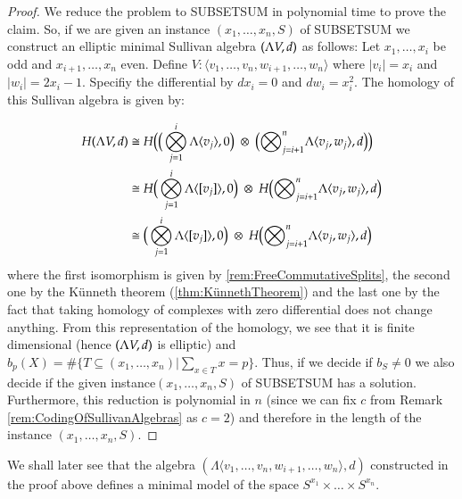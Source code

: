  \begin{proof}
  We reduce the problem to SUBSETSUM in polynomial time to prove the claim.
  So, if we are given an instance $(x_1, \ldots, x_n, S)$ of SUBSETSUM we construct an elliptic minimal Sullivan
  algebra $(\Lambda V,d)$ as follows: \newline
  Let $x_1, \ldots, x_i$ be odd and $x_{i+1}, \ldots, x_n$ even. Define 
  $V \colon \langle v_1, \ldots, v_n, w_{i+1}, \ldots , w_n \rangle$ where $|v_i| = x_i$ and $|w_i| = 2x_i -1$.
  Specifiy the differential by $dx_i = 0$ and $dw_i = x_i^2$. The homology of this Sullivan algebra is given by:
   
  \begin{align*}
  H (\Lambda V,d) &\cong H \big{(} \big{(}\bigotimes_{j = 1}^i \Lambda \langle v_j \rangle , 0 \big{)} \;\otimes \;  
  \big{(} {\bigotimes}_{j=i + 1}^n \Lambda \langle v_{j} ,w_{j}\rangle , d \big{)} \big{)}  \\
  &\cong H\big{(} \bigotimes_{j = 1}^i \Lambda \langle [v_j] \rangle , 0 \big{)}
  \; \otimes \;H \big{(}  {\bigotimes}_{j=i + 1}^n \Lambda \langle v_{j} ,w_{j}\rangle  , d\big{)} \\ 
  &\cong \big{(} \bigotimes_{j = 1}^i \Lambda \langle [v_j] \rangle , 0 \big{)}
  \; \otimes \;H \big{(}  {\bigotimes}_{j=i + 1}^n \Lambda \langle v_{j} ,w_{j}\rangle  , d\big{)}
  \end{align*}
  where the first isomorphism is given by \ref{rem:FreeCommutativeSplits}, the second one by the Künneth theorem
  (\ref{thm:KünnethTheorem})
  and the last one by the fact that taking homology of complexes with zero differential does not change anything.
  From this representation of the homology,
  we see that it is finite dimensional (hence $(\Lambda V,d)$ is elliptic) and 
  ${b_p(X) = \# {\lbrace T \subseteq (x_1, \ldots, x_n) | \sum_{x \in T} x = p \rbrace}}$.
  Thus, if we decide if $b_S \neq 0$ we also decide if the given instance$(x_1, \ldots, x_n, S)$ of SUBSETSUM
  has a solution. Furthermore, this reduction is polynomial in $n$ 
  (since we can fix $c$ from Remark \ref{rem:CodingOfSullivanAlgebras} as $c = 2$)
  and therefore in the length of the instance $(x_1, \ldots, x_n, S)$. 
 \end{proof}

 \begin{Remark}
  We shall later see that the algebra $ (\Lambda \langle v_1, \ldots, v_n,w_{i+1}, \ldots, w_n \rangle , d)$
  constructed in the proof above defines
  a minimal model of the space $S^{x_1} \times \ldots \times S^{x_n}$.
 \end{Remark}

